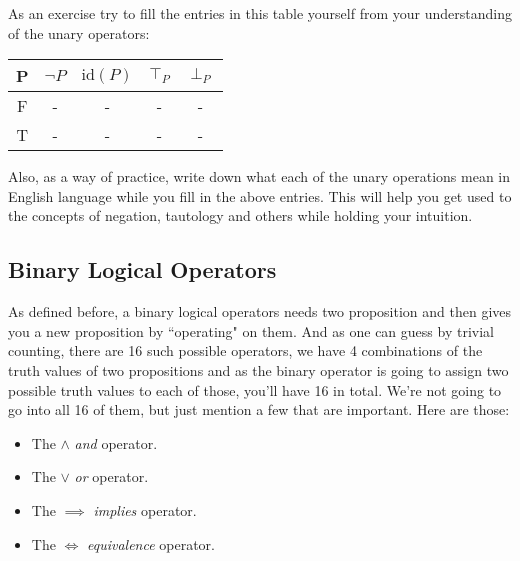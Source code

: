 \documentclass[a4paper]{article}
\begin{document}
\begin{exercise}
As an exercise try to fill the entries in this table yourself from your understanding of the unary operators:

\begin{center}
	\begin{tabular}{c||c|c|c|c}
		P & $\neg P$ & $\mathrm{id}(P)$ & $\top_{P}$ & $\perp_{P}$ \\
		\hline
		F & - & - & - & - \\
		T & - & - & - & -

	\end{tabular}
\end{center}

Also, as a way of practice, write down what each of the unary operations mean in English language while you fill in the above entries. This will help you get used to the concepts of negation, tautology and others while holding your intuition. 
\end{exercise}

\subsection{Binary Logical Operators}

As defined before, a binary logical operators needs two proposition and then gives you a new proposition by ``operating" on them. And as one can guess by trivial counting, there are 16 such possible operators, we have 4 combinations of the truth values of two propositions and as the binary operator is going to assign two possible truth values to each of those, you'll have 16 in total. We're not going to go into all 16 of them, but just mention a few that are important. Here are those:

\begin{itemize}
	\item The $\land$ \textit{and} operator.
	\item The $\lor$ \textit{or} operator.
	\item The $\implies$ \textit{implies} operator.
	\item The $\iff$ \textit{equivalence} operator.
\end{itemize}
\end{document}
